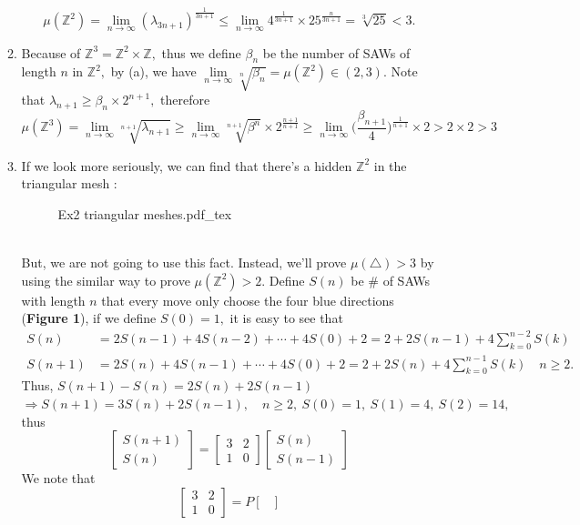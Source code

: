 \documentclass[12pt,a4paper]{report}
\theoremstyle{definition}
\newcommand{\incfig}[1]{%
{#1.pdf_tex}
}
\begin{document}
\begin{enumerate}
\begin{enumerate}
		\[
		\mu(\mathbb{Z}^2)=\lim_{n\to\infty}(\lambda_{3n+1})^{\frac{1}{3n+1}}\leq \lim_{n\to\infty}4^{\frac{1}{3n+1}}\times 25^{\frac{n}{3n+1}}=\sqrt[3]{25}<3.
		\]
		\item Because of $\mathbb{Z}^3=\mathbb{Z}^2\times \mathbb{Z},$ thus we define $\beta_n$ be the number of SAWs of length $n$ in $\mathbb{Z}^2,$ by (a), we have $\lim\limits_{n\to\infty}\sqrt[n]{\beta_n}=\mu(\mathbb{Z}^2)\in(2,3).$ Note that $\lambda_{n+1}\geq \beta_n\times 2^{n+1},$ therefore 
		\[
		\mu(\mathbb{Z}^3)=\lim_{n\to\infty}\sqrt[n+1]{\lambda_{n+1}}\geq \lim_{n\to\infty}\sqrt[n+1]{\beta^n}\times 2^{\frac{n+1}{n+1}}\geq \lim_{n\to\infty}\Big(\frac{\beta_{n+1}}{4}\Big)^{\frac{1}{n+1}}\times 2>2\times 2>3
		\]
		\item If we look more seriously, we can find that there's a hidden $\mathbb{Z}^2$ in the triangular mesh :
		\begin{figure}[htp]
		\centering
		\def\svgwidth{6cm}
		\incfig{Ex2 triangular meshes}
		\end{figure}
		\\
		But, we are not going to use this fact. Instead, we'll prove $\mu(\triangle)>3$ by using the similar way to prove $\mu(\mathbb{Z}^2)>2.$ Define $S(n)$ be \# of SAWs with length $n$ that every move only choose the four blue directions (\textbf{Figure 1}), if we define $S(0)=1,$ it is easy to see that 
		\begin{align*}
		S(n)&=2S(n-1)+4S(n-2)+\cdots +4S(0)+2=2+2S(n-1)+4\sum_{k=0}^{n-2}S(k)\\
		S(n+1)&=2S(n)+4S(n-1)+\cdots +4S(0)+2=2+2S(n)+4\sum_{k=0}^{n-1}S(k)\quad n\geq 2.
		\end{align*}
		\newpage
		Thus, $S(n+1)-S(n)=2S(n)+2S(n-1)$\\$\Rightarrow S(n+1)=3S(n)+2S(n-1),\quad n\geq 2,\ S(0)=1,\ S(1)=4,\ S(2)=14,$ thus
		\[
		\begin{bmatrix}
		S(n+1)\\
		S(n)
		\end{bmatrix}=\begin{bmatrix}
		3 & 2\\
		1 & 0
		\end{bmatrix}\begin{bmatrix}
		S(n)\\
		S(n-1)
		\end{bmatrix}
		\]
		We note that 
		\[
		\begin{bmatrix}
		3 & 2\\
		1 & 0
		\end{bmatrix}=P\begin{bmatrix}

\end{bmatrix}\]
\end{enumerate}
\end{enumerate}
\end{document}
